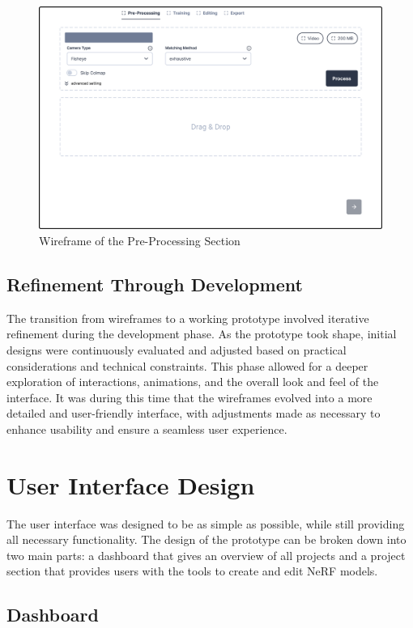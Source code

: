 \begin{figure}[htb]
  \includegraphics[width=\textwidth]{figures/wireframe.png}
  \caption{Wireframe of the Pre-Processing Section}
  \label{fig:design:wireframe}
\end{figure}

\subsection*{Refinement Through Development}

The transition from wireframes to a working prototype involved iterative refinement during the development phase. 
As the prototype took shape, initial designs were continuously evaluated and adjusted based on practical considerations and technical constraints. 
This phase allowed for a deeper exploration of interactions, animations, and the overall look and feel of the interface. 
It was during this time that the wireframes evolved into a more detailed and user-friendly interface, with adjustments made as necessary to enhance usability and ensure a seamless user experience.

\section{User Interface Design}
The user interface was designed to be as simple as possible, while still providing all necessary functionality. 
The design of the prototype can be broken down into two main parts: a dashboard that gives an overview of all projects and a project section that provides users with the tools to create and edit NeRF models.

\subsection*{Dashboard}

